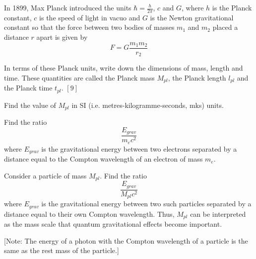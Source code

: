 \begin{problem}
    In 1899, Max Planck introduced the units $\hbar=\frac{h}{2\pi}$, $c$ and $G$, where $h$ is the Planck constant, $c$ is the speed of light in vacuo and $G$ is the Newton gravitational constant so that the force between two bodies of masses $m_1$ and $m_2$ placed a distance $r$ apart is given by \[F=G\frac{m_1 m_2}{r_2}\]

    \begin{subproblem}
        In terms of these Planck units, write down the dimensions of mass, length and time. These quantities are called the Planck mass $M_{pl}$, the Planck length $l_{pl}$ and the Planck time $t_{pl}$. \hfill $[9]$
    \end{subproblem}

    \begin{subproblem}
        Find the value of $M_{pl}$ in SI (i.e. metres-kilogramme-seconds, mks) units.
    \end{subproblem}

    \begin{subproblem}
        Find the ratio \[\frac{E_{grav}}{m_e c^2}\] where $E_{grav}$ is the gravitational energy between two electrons separated by a distance equal to the Compton wavelength of an electron of mass $m_e$.
    \end{subproblem}

    \begin{subproblem}
        Consider a particle of mass $M_{pl}$. Find the ratio \[\frac{E_{grav}}{M_{pl} c^2}\] where $E_{grav}$  is the gravitational energy between two such particles separated by a distance equal to their own Compton wavelength. Thus, $M_{pl}$ can be interpreted as the mass scale that quantum gravitational effects become important. 

        
        [Note: The energy of a photon with the Compton wavelength of a particle is the same as the rest mass of the particle.]


    \end{subproblem}
\end{problem}


